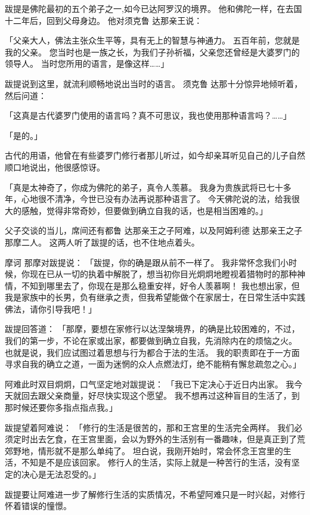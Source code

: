\documentclass[twoside,openany]{book}
\begin{document}
跋提是佛陀最初的五个弟子之一,如今已达阿罗汉的境界。
他和佛陀一样，在去国十二年后，回到父母身边。
他对须克鲁 \textperiodcentered 达那亲王说：

「父亲大人，佛法主张众生平等，具有无上的智慧与神通力。
五百年前，您就是我的父亲。
您当时也是一族之长，为我们子孙祈福，父亲您还曾经是大婆罗门的领导人。
当时您所用的语言，是像这样……」

跋提说到这里，就流利顺畅地说出当时的语言。
须克鲁 \textperiodcentered 达那十分惊异地倾听着，然后问道：

「这真是古代婆罗门使用的语言吗？真不可思议，我也使用那种语言吗？……」

「是的。」

古代的用语，他曾在有些婆罗门修行者那儿听过，如今却亲耳听见自己的儿子自然顺口地说出，他很感惊讶。

「真是太神奇了，你成为佛陀的弟子，真令人羡慕。
我身为贵族武将已七十多年，心地很不清净，今世已没有办法再说那种语言了。
今天佛陀说的法，给我很大的感触，觉得非常奇妙，但要做到确立自我的话，也是相当困难的。」

父子交谈的当儿，席间还有都鲁 \textperiodcentered 达那亲王之子阿难，以及阿姆利德 \textperiodcentered 达那亲王之子那摩二人。
这两人听了跋提的话，也不住地点着头。

摩诃 \textperiodcentered 那摩对跋提说：
「跋提，你的确是跟从前不一样了。
我非常怀念我们小时候，你现在已从一切的执着中解脱了，想当初你目光炯炯地瞪视着猎物时的那种神情，不知到哪里去了，你现在是那么稳重安祥，好令人羡慕啊！
我也想出家，但我是家族中的长男，负有继承之责，但我希望能做个在家居士，在日常生活中实践佛法，请你引导我吧！」

跋提回答道：
「那摩，要想在家修行以达涅槃境界，的确是比较困难的，不过，我们的第一步，不论在家或出家，都要做到确立自我，先消除内在的烦恼之火。
也就是说，我们应试图过着思想与行为都合于法的生活。
我的职责即在于一方面寻求自我的确立之道，一面为迷惘的众人点燃法灯，绝不能稍有懈怠疏忽之心。」

阿难此时双目炯炯，口气坚定地对跋提说：
「我已下定决心于近日内出家。
我今天就回去跟父亲商量，好尽快实现这个愿望。
我不想再过这种盲目的生活了，到那时候还要你多指点指点我。」

跋提望着阿难说：
「修行的生活是很苦的，那和王宫里的生活完全两样。
我们必须定时出去乞食，在王宫里面，会以为野外的生活别有一番趣味，但是真正到了荒郊野地，情形就不是那么单纯了。
坦白说，我刚开始时，常会怀念王宫里的生活，不知是不是应该回家。
修行人的生活，实际上就是一种苦行的生活，没有坚定的决心是无法忍受的。」

跋提要让阿难进一步了解修行生活的实质情况，不希望阿难只是一时兴起，对修行怀着错误的憧憬。
\end{document}
